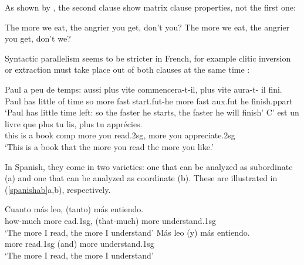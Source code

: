 \documentclass[output=paper]{langsci/langscibook}
\begin{document}
As shown by \citet[549-550]{culijack}, the second clause show matrix clause properties, not the first one:

\begin{exe}
 \ex
\begin{xlista}
\ex	The more we eat, the angrier you get, don’t you?
\ex	*The more we eat, the angrier you get, don’t we?
\end{xlista}
\end{exe}

Syntactic parallelism seems to be stricter in French, for example clitic inversion or extraction must take place out of both clauses at the same time \citep{Abeille:Borsley:08}:

\begin{exe}
 \ex
\begin{xlista}
\ex \gll Paul a     peu  de temps: aussi plus  vite commencera-t-il,  plus   vite  aura-t-      il  fini.\\
Paul has little of time so more fast start.{\sc fut}-he more fast  aux.{\sc fut} he finish.{\sc ppart} \\
\glt `Paul has little time left: so the faster he starts, the faster he will finish'
\ex \gll C'   est un livre  que      plus   tu    lis, plus  tu    appr\'{e}cies. \\
this is    a  book {\sc comp} more you read.2{\sc sg},  more you appreciate.2{\sc sg} \\
\glt `This is a book that the more you read the more you like.'
\end{xlista}
\end{exe}

In Spanish, they come in two varieties: one that can be analyzed as subordinate (a) and one that can be analyzed as coordinate (b).
These are illustrated in (\ref{spanishab}a,b), respectively.


\begin{exe}
 \ex
\begin{xlista}
\ex \gll	Cuanto       m\'{a}s   leo,     (tanto)        m\'{a}s entiendo. \\
how-much more ead.1{\sc sg}, (that-much) more understand.1{\sc sg} \\
\glt `The more I read, the more I understand'
\ex \gll	M\'{a}s leo        (y) m\'{a}s entiendo. \\
	more read.1{\sc sg} (and) more understand.1{\sc sg} \\
\glt `The more I read, the more I understand'\\
\citep{Abeille:Borsley:Espinal:06}
\end{xlista}\label{spanishab}
\end{exe}
\end{document}
